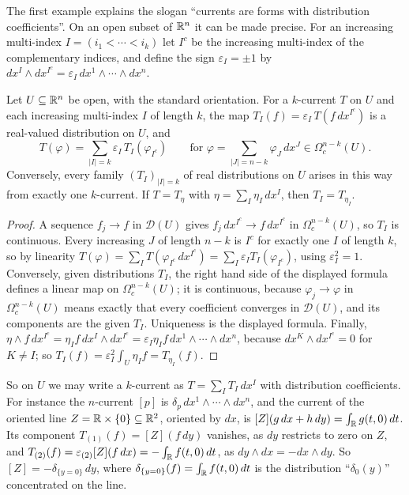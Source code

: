 The first example explains the slogan ``currents are forms with distribution coefficients''. On an open subset of $\mathbb{R}^n$ it can be made precise. For an increasing multi-index
$I = (i_1 < \cdots < i_k)$ let $I^c$ be the increasing multi-index of the complementary indices, and define the sign $\varepsilon_I = \pm1$ by
$dx^I \wedge dx^{I^c} = \varepsilon_I\,dx^1 \wedge \cdots \wedge dx^n$.

\begin{proposition}\label{de-rham:proposition-currents-local}
Let $U \subseteq \mathbb{R}^n$ be open, with the standard orientation. For a $k$-current $T$ on $U$ and each increasing multi-index $I$ of length $k$, the map
$T_I(f) = \varepsilon_I\,T(f\,dx^{I^c})$ is a real-valued distribution on $U$, and
\[
T(\varphi) = \sum_{|I| = k}\varepsilon_I\,T_I(\varphi_{I^c}) \qquad \text{for } \varphi = \sum_{|J| = n-k}\varphi_J\,dx^J \in \Omega^{n-k}_c(U).
\]
Conversely, every family $(T_I)_{|I| = k}$ of real distributions on $U$ arises in this way from exactly one $k$-current. If $T = T_\eta$ with $\eta = \sum_I\eta_I\,dx^I$, then $T_I = T_{\eta_I}$.
\end{proposition}

\begin{proof}
A sequence $f_j \to f$ in $\mathcal{D}(U)$ gives $f_j\,dx^{I^c} \to f\,dx^{I^c}$ in $\Omega^{n-k}_c(U)$, so $T_I$ is continuous. Every increasing $J$ of length $n - k$ is $I^c$ for exactly one $I$
of length $k$, so by linearity $T(\varphi) = \sum_IT(\varphi_{I^c}\,dx^{I^c}) = \sum_I\varepsilon_IT_I(\varphi_{I^c})$, using $\varepsilon_I^2 = 1$. Conversely, given distributions $T_I$, the right hand side
of the displayed formula defines a linear map on $\Omega^{n-k}_c(U)$; it is continuous, because $\varphi_j \to \varphi$ in $\Omega^{n-k}_c(U)$ means exactly that every coefficient converges in
$\mathcal{D}(U)$, and its components are the given $T_I$. Uniqueness is the displayed formula. Finally, $\eta \wedge f\,dx^{I^c} = \eta_If\,dx^I \wedge dx^{I^c} = \varepsilon_I\eta_If\,dx^1 \wedge \cdots \wedge dx^n$,
because $dx^K \wedge dx^{I^c} = 0$ for $K \neq I$; so $T_I(f) = \varepsilon_I^2\int_U\eta_If = T_{\eta_I}(f)$.
\end{proof}

So on $U$ we may write a $k$-current as $T = \sum_IT_I\,dx^I$ with distribution coefficients. For instance the $n$-current $[p]$ is $\delta_p\,dx^1 \wedge \cdots \wedge dx^n$, and the
current of the oriented line $Z = \mathbb{R} \times \{0\} \subseteq \mathbb{R}^2$, oriented by $dx$, is $[Z](g\,dx + h\,dy) = \int_{\mathbb{R}} g(t, 0)\,dt$. Its component $T_{(1)}(f) = [Z](f\,dy)$ vanishes, as $dy$ restricts to zero on $Z$, and
$T_{(2)}(f) = \varepsilon_{(2)}[Z](f\,dx) = -\int_{\mathbb{R}} f(t, 0)\,dt$, as $dy \wedge dx = -dx \wedge dy$. So $[Z] = -\delta_{\{y = 0\}}\,dy$, where $\delta_{\{y = 0\}}(f) = \int_{\mathbb{R}} f(t, 0)\,dt$ is the
distribution ``$\delta_0(y)$'' concentrated on the line.

